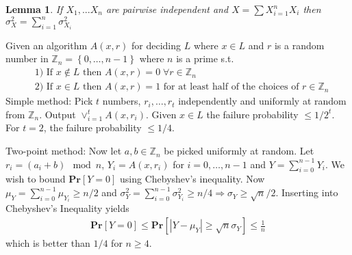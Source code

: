 \documentclass[12pt]{article}
\newtheorem{lem}[thm]{Lemma}
\begin{document}
\begin{lem}
If $X_1, ... X_n$ are pairwise independent and $X = \sum X_{i=1}^n X_i$ then $\sigma^2_X = \sum_{i=1}^n \sigma_{X_i}^2$
\end{lem}

Given an algorithm $A(x,r)$ for deciding $L$ where $x \in L$ and $r$ is a random number in $\mathbb{Z}_n = \left\{ 0, \hdots, n-1 \right\}$ where $n$ is a prime s.t.
\begin{align*}
&\text{1) If } x \not\in L \text{ then } A(x,r) = 0 \; \forall r \in \mathbb{Z}_n \\
&\text{2) If } x \in L \text{ then } A(x,r) = 1 \text{ for at least half of the choices of } r \in \mathbb{Z}_n
\end{align*}
Simple method: Pick $t$ numbers, $r_i, \hdots, r_t$ independently and uniformly at random from $\mathbb{Z}_n$. Output $\lor_{i=1}^t A(x,r_i)$. Given $x \in L$ the failure probability $\leq 1/2^t$. For $t=2$, the failure probability $\leq 1/4$.

Two-point method: Now let $a,b \in \mathbb{Z}_n$ be picked uniformly at random. Let $r_i = (a_i + b) \mod n$, $Y_i = A(x, r_i)$ for $i = 0, \hdots, n-1$ and $Y=\sum_{i=0}^{n-1}Y_i$. We wish to bound $\mathbf{Pr}\left[ Y=0 \right]$ using Chebyshev's inequality. Now $\mu_{Y} = \sum^{n-1}_{i=0}\mu_{Y_i} \geq n/2$ and $\sigma_Y^2 = \sum_{i=0}^{n-1} \sigma^2_{Y_{i}} \geq n/4 \Rightarrow \sigma_Y \geq \sqrt{n}/2$. Inserting into Chebyshev's Inequality yields
\begin{align*}
\mathbf{Pr}\left[ Y = 0 \right] \leq \mathbf{Pr}\left[ \left| Y - \mu_Y \right| \geq \sqrt{n} \sigma_Y \right] \leq \frac{1}{n}
\end{align*}
which is better than $1/4$ for $n \geq 4$.
\end{document}
